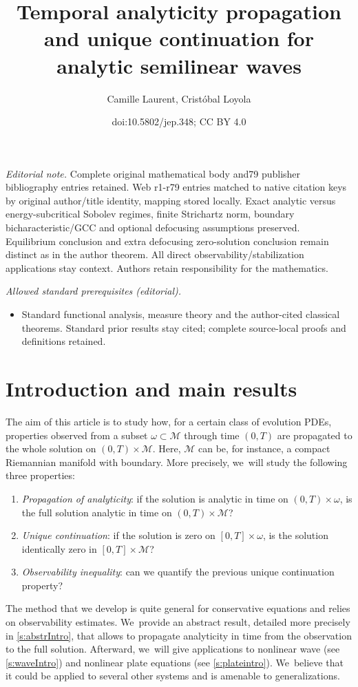 \documentclass[10pt]{amsart}
\title{Temporal analyticity propagation and unique continuation for analytic semilinear waves}
\author{Camille Laurent, Cristóbal Loyola}
\date{doi:10.5802/jep.348; CC BY 4.0}
\theoremstyle{definition}
\let\mc\mathcal
\newcommand{\M}{\mc{M}}
\begin{document}
\maketitle
\noindent\textit{Editorial note.} Complete original mathematical body and79 publisher bibliography entries retained. Web r1-r79 entries matched to native citation keys by original author/title identity, mapping stored locally. Exact analytic versus energy-subcritical Sobolev regimes, finite Strichartz norm, boundary bicharacteristic/GCC and optional defocusing assumptions preserved. Equilibrium conclusion and extra defocusing zero-solution conclusion remain distinct as in the author theorem. All direct observability/stabilization applications stay context. Authors retain responsibility for the mathematics.\par\medskip
\noindent\textit{Allowed standard prerequisites (editorial).}\begin{itemize}
\item Standard functional analysis, measure theory and the author-cited classical theorems. Standard prior results stay cited; complete source-local proofs and definitions retained.
\end{itemize}\medskip
\vspace*{-\baselineskip}
\tableofcontents



\section{Introduction and main results}
The aim of this article is to study how, for a certain class of evolution PDEs, properties observed from a subset $\omega\subset \M$ through time $(0, T)$ are propagated to the whole solution on $(0, T)\times \M$. Here, $\M$ can be, for instance, a compact Riemannian manifold with boundary. More precisely, we~will study the following three properties:
\begin{enumerate}
\item \emph{Propagation of analyticity}: if the solution is analytic in time on $(0,T)\times \omega$, is the full solution analytic in time on $(0,T)\times\M$?
\item \emph{Unique continuation}: if the solution is zero on $[0, T]\times \omega$, is the solution identically zero in $[0, T]\times\M$?
\item \emph{Observability inequality}: can we quantify the previous unique continuation property?
\end{enumerate}
The method that we develop is quite general for conservative equations and relies on observability estimates. We~provide an abstract result, detailed more precisely in \cref{s:abstrIntro}, that allows to propagate analyticity in time from the observation to the full solution. Afterward, we~will give applications to nonlinear wave (see \cref{s:waveIntro}) and nonlinear plate equations (see \cref{s:plateintro}). We~believe that it could be applied to several other systems and is amenable to generalizations.
\end{document}
